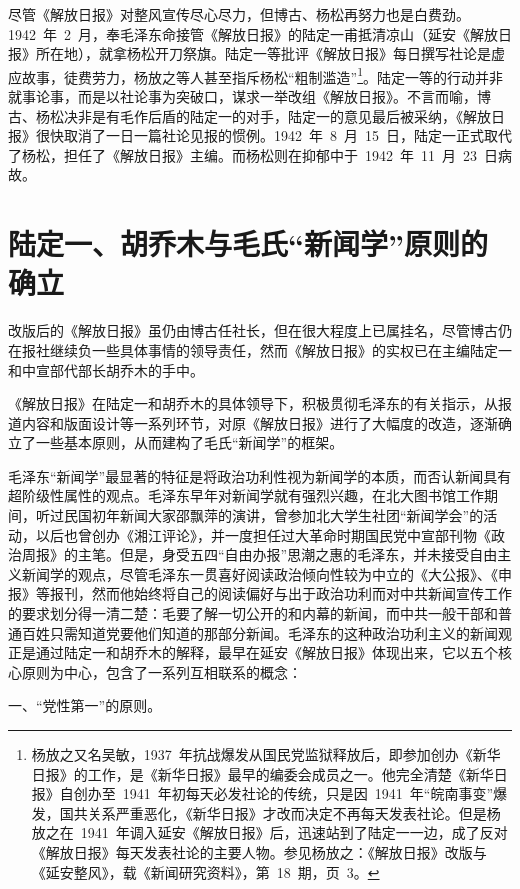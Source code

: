 尽管《解放日报》对整风宣传尽心尽力，但博古、杨松再努力也是白费劲。1942~年~2~月，奉毛泽东命接管《解放日报》的陆定一甫抵清凉山（延安《解放日报》所在地），就拿杨松开刀祭旗。陆定一等批评《解放日报》每日撰写社论是虚应故事，徒费劳力，杨放之等人甚至指斥杨松“粗制滥造”\footnote{杨放之又名吴敏，1937~年抗战爆发从国民党监狱释放后，即参加创办《新华日报》的工作，是《新华日报》最早的编委会成员之一。他完全清楚《新华日报》自创办至~1941~年初每天必发社论的传统，只是因~1941~年“皖南事变”爆发，国共关系严重恶化，《新华日报》才改而决定不再每天发表社论。但是杨放之在~1941~年调入延安《解放日报》后，迅速站到了陆定一一边，成了反对《解放日报》每天发表社论的主要人物。参见杨放之：《解放日报》改版与《延安整风》，载《新闻研究资料》，第~18~期，页~3。}。陆定一等的行动并非就事论事，而是以社论事为突破口，谋求一举改组《解放日报》。不言而喻，博古、杨松决非是有毛作后盾的陆定一的对手，陆定一的意见最后被采纳，《解放日报》很快取消了一日一篇社论见报的惯例。1942~年~8~月~15~日，陆定一正式取代了杨松，担任了《解放日报》主编。而杨松则在抑郁中于~1942~年~11~月~23~日病故。


\section{陆定一、胡乔木与毛氏“新闻学”原则的确立}

改版后的《解放日报》虽仍由博古任社长，但在很大程度上已属挂名，尽管博古仍在报社继续负一些具体事情的领导责任，然而《解放日报》的实权已在主编陆定一和中宣部代部长胡乔木的手中。

《解放日报》在陆定一和胡乔木的具体领导下，积极贯彻毛泽东的有关指示，从报道内容和版面设计等一系列环节，对原《解放日报》进行了大幅度的改造，逐渐确立了一些基本原则，从而建构了毛氏“新闻学”的框架。

毛泽东“新闻学”最显著的特征是将政治功利性视为新闻学的本质，而否认新闻具有超阶级性属性的观点。毛泽东早年对新闻学就有强烈兴趣，在北大图书馆工作期间，听过民国初年新闻大家邵飘萍的演讲，曾参加北大学生社团“新闻学会”的活动，以后也曾创办《湘江评论》，并一度担任过大革命时期国民党中宣部刊物《政治周报》的主笔。但是，身受五四“自由办报”思潮之惠的毛泽东，并未接受自由主义新闻学的观点，尽管毛泽东一贯喜好阅读政治倾向性较为中立的《大公报》、《申报》等报刊，然而他始终将自己的阅读偏好与出于政治功利而对中共新闻宣传工作的要求划分得一清二楚：毛要了解一切公开的和内幕的新闻，而中共一般干部和普通百姓只需知道党要他们知道的那部分新闻。毛泽东的这种政治功利主义的新闻观正是通过陆定一和胡乔木的解释，最早在延安《解放日报》体现出来，它以五个核心原则为中心，包含了一系列互相联系的概念：

一、“党性第一”的原则。

